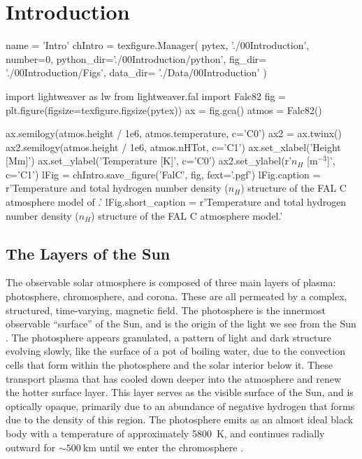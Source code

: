 \chapter{Introduction}
\begin{pycode}[Intro]
name = 'Intro'
chIntro = texfigure.Manager(
    pytex,
    './00Introduction',
    number=0,
    python_dir='./00Introduction/python',
    fig_dir=   './00Introduction/Figs',
    data_dir=  './Data/00Introduction'
)
\end{pycode}


\begin{pycode}[Intro]
import lightweaver as lw
from lightweaver.fal import Falc82
fig = plt.figure(figsize=texfigure.figsize(pytex))
ax = fig.gca()
atmos = Falc82()

ax.semilogy(atmos.height / 1e6, atmos.temperature, c='C0')
ax2 = ax.twinx()
ax2.semilogy(atmos.height / 1e6, atmos.nHTot, c='C1')
ax.set_xlabel('Height [Mm]')
ax.set_ylabel('Temperature [K]', c='C0')
ax2.set_ylabel(r'$n_H$ [m$^{-3}$]', c='C1')
lFig = chIntro.save_figure('FalC', fig, fext='.pgf')
lFig.caption = r'Temperature and total hydrogen number density ($n_H$) structure of the FAL C atmosphere model of \citep{Fontenla1993}.'
lFig.short_caption = r'Temperature and total hydrogen number density ($n_H$) structure of the FAL C atmosphere model.'
\end{pycode}

\section{The Layers of the Sun}

The observable solar atmosphere is composed of three main layers of plasma: photosphere, chromosphere, and corona.
These are all permeated by a complex, structured, time-varying, magnetic field.
The photosphere is the innermost observable ``surface'' of the Sun, and is the origin of the light we see from the Sun \citep{Zirin1992}.
The photosphere appears granulated, a pattern of light and dark structure evolving slowly, like the surface of a pot of boiling water, due to the convection cells that form within the photosphere and the solar interior below it.
These transport plasma that has cooled down deeper into the atmosphere and renew the hotter surface layer.
This layer serves as the visible surface of the Sun, and is optically opaque, primarily due to an abundance of negative hydrogen that forms due to the density of this region.
The photosphere emits as an almost ideal black body with a temperature of approximately \SI{5800}{\kelvin}, and continues radially outward for $\sim\SI{500}{\kilo\metre}$ until we enter the chromosphere \citep{Carroll2007}.

